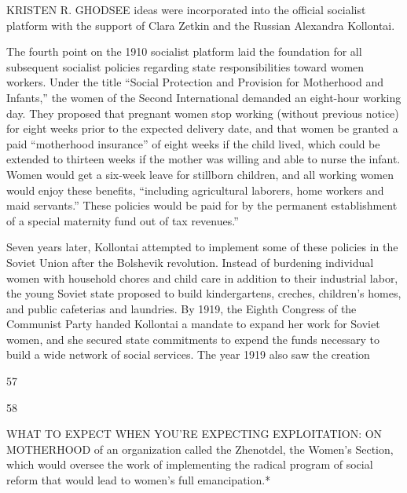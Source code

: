  \par 
KRISTEN R. GHODSEE ideas were incorporated into the official socialist platform with the support of Clara Zetkin and the Russian Alexandra Kollontai.
 \par 
The fourth point on the 1910 socialist platform laid the foundation for all subsequent socialist policies regarding state responsibilities toward women workers. Under the title “Social Protection and Provision for Motherhood and Infants,” the women of the Second International demanded an eight-hour working day. They proposed that pregnant women stop working (without previous notice) for eight weeks prior to the expected delivery date, and that women be granted a paid “motherhood insurance” of eight weeks if the child lived, which could be extended to thirteen weeks if the mother was willing and able to nurse the infant. Women would get a six-week leave for stillborn children, and all working women would enjoy these benefits, “including agricultural laborers, home workers and maid servants.” These policies would be paid for by the permanent establishment of a special maternity fund out of tax revenues.”
 \par 
Seven years later, Kollontai attempted to implement some of these policies in the Soviet Union after the Bolshevik revolution. Instead of burdening individual women with household chores and child care in addition to their industrial labor, the young Soviet state proposed to build kindergartens, creches, children’s homes, and public cafeterias and laundries. By 1919, the Eighth Congress of the Communist Party handed Kollontai a mandate to expand her work for Soviet women, and she secured state commitments to expend the funds necessary to build a wide network of social services. The year 1919 also saw the creation
 \par 
57
 \par 
58
 \par 
WHAT TO EXPECT WHEN YOU'RE EXPECTING EXPLOITATION: ON MOTHERHOOD of an organization called the Zhenotdel, the Women’s Section, which would oversee the work of implementing the radical program of social reform that would lead to women’s full emancipation.*
 \par 
